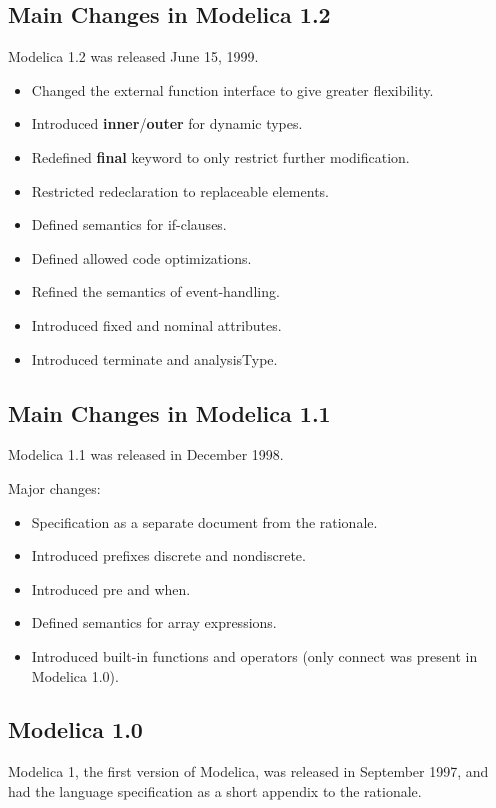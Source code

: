 \subsection{Main Changes in Modelica 1.2}
Modelica 1.2 was released June 15, 1999.

\begin{itemize}
\item
  Changed the external function interface to give greater flexibility.
\item
  Introduced \textbf{inner}/\textbf{outer} for dynamic types.
\item
  Redefined \textbf{final} keyword to only restrict further
  modification.
\item
  Restricted redeclaration to replaceable elements.
\item
  Defined semantics for if-clauses.
\item
  Defined allowed code optimizations.
\item
  Refined the semantics of event-handling.
\item
  Introduced fixed and nominal attributes.
\item
  Introduced terminate and analysisType.
\end{itemize}

\subsection{Main Changes in Modelica 1.1}
Modelica 1.1 was released in December 1998.

Major changes:

\begin{itemize}
\item
  Specification as a separate document from the rationale.
\item
  Introduced prefixes discrete and nondiscrete.
\item
  Introduced pre and when.
\item
  Defined semantics for array expressions.
\item
  Introduced built-in functions and operators (only connect was present
  in Modelica 1.0).
\end{itemize}

\subsection{Modelica 1.0}

Modelica 1, the first version of Modelica, was released in September
1997, and had the language specification as a short appendix to the
rationale.
